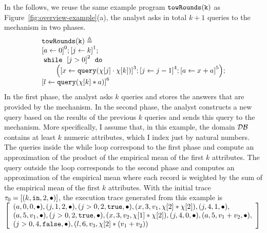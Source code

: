 \begin{example}
    In the follows, we reuse the same example program $\mathtt{towRounds(k)}$ as Figure~\ref{fig:overview-example}(a),
    the analyst asks in total $k+1$ queries to the mechanism in two phases.
    \[         
        \begin{array}{l}
      \kw{towRounds(k)} \triangleq \\
             \clabel{ \assign{a}{0}}^{0} ;
              \clabel{\assign{j}{k} }^{1} ;\\
              \ewhile ~ \clabel{j > 0}^{2} ~ \edo ~
              \\ \qquad
              \Big(
               \clabel{\assign{x}{\query(\chi[j] \cdot \chi[k])} }^{3}  ;
               \clabel{\assign{j}{j-1}}^{4} ;
              \clabel{\assign{a}{x + a}}^{5}       \Big);\\
              \clabel{\assign{l}{\query(\chi[k]*a)} }^{6}
          \end{array}
          \]
    In the first phase, the analyst asks $k$ queries and stores the answers that are provided by the mechanism. 
    In the second phase, the analyst constructs a new query based on the results of the previous $k$ queries and sends this query to the mechanism. More specifically, I assume that, in this example, the domain $\mathcal{DB}$ 
    contains at least $k$ numeric attributes, which I index just by natural numbers. 
    The queries inside the while loop correspond to the first phase and compute an approximation of 
    the product of the empirical mean of the first $k$ attributes. 
    The query outside the loop corresponds to the second phase and computes an approximation of the empirical mean where each record is weighted by the sum of the empirical mean of the first $k$ attributes.
    With the initial trace
    $\mathtt{\tau}_0 = [(k, \mathtt{in}, 2, \bullet)]$,
    the execution trace generated from this example is 
   \\
    $
    \left[\begin{array}{l}
     (a, 0, 0, \bullet),
    (j, 1, 2, \bullet),
    (j>0, 2, \etrue, \bullet),
    (x, 3, v_1, \chi[2]*\chi[2]),
    (j, 4, 1, \bullet),\\
    (a, 5, v_1, \bullet),
    (j>0, 2, \etrue, \bullet),
    (x, 3, v_2, \chi[1]*\chi[2]),
    (j, 4, 0, \bullet),
    (a, 5, v_1 + v_2, \bullet),\\
    (j>0, 4, \efalse, \bullet),
    (l, 6, v_3, \chi[2]*( v_1 + v_2))
    \end{array} \right]
    $
\end{example}